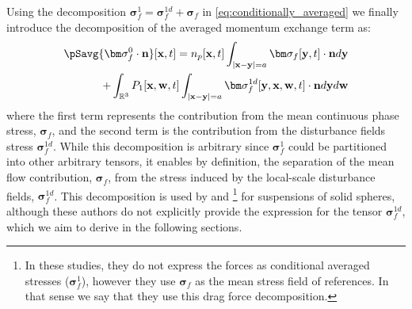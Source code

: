 Using the decomposition $\bm\sigma_f^1 = \bm\sigma_f^{1d} + \bm\sigma_f$ in \ref{eq:conditionally_averaged} we finally introduce the decomposition of the averaged momentum exchange term as:  
\begin{align}
    \pSavg{\bm\sigma_f^0\cdot\textbf{n}}[\textbf{x},t]
    =
    n_p[\textbf{x},t]
    \int_{|\textbf{x}-\textbf{y}|=a}
    \bm\sigma_f[\textbf{y},t]
    \cdot \textbf{n}
    d\textbf{y}
    \nonumber
    \\
    + 
    \int_{\mathbb{R}^3}
    P_1[\textbf{x},\textbf{w},t]
    \int_{|\textbf{x}-\textbf{y}|=a}
    \bm\sigma_f^{1d}[\textbf{y},\textbf{x},\textbf{w},t]
    \cdot \textbf{n}
    d\textbf{y}
    d\textbf{w}
    \label{eq:general_partition}
\end{align}
where the first term represents the contribution from the mean continuous phase stress, $\bm\sigma_f$, and the second term is the contribution from the disturbance fields stress $\bm\sigma_f^{1d}$. 
While this decomposition is arbitrary since $\bm\sigma_f^1$ could be partitioned into other arbitrary tensors, it enables by definition, the separation of the mean flow contribution, $\bm\sigma_f$, from the stress induced by the local-scale disturbance fields, $\bm\sigma_f^{1d}$.
This decomposition is used by \citet[Chapter 2]{jackson2000} and \citet{zhang1997momentum,wang2021numerical,wang2024effect}\footnote{In these studies, they do not express the forces as conditional averaged stresses ($\bm\sigma_f^1$), however they use $\bm\sigma_f$ as the mean stress field of references.
In that sense we say that they use this drag force decomposition.   } for suspensions of solid spheres, although these authors do not explicitly provide the expression for the tensor $\bm\sigma_f^{1d}$, which we aim to derive in the following sections. 

